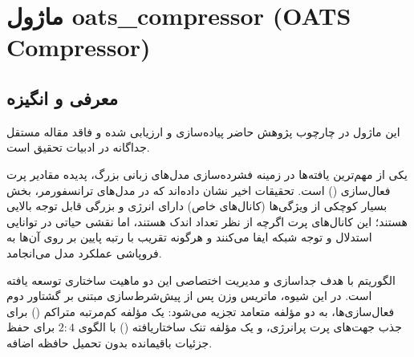 \section{ماژول oats\_compressor (OATS Compressor)}
\label{sec:module_oats_compressor}

\subsection{معرفی و انگیزه}
این ماژول در چارچوب پژوهش حاضر پیاده‌سازی و ارزیابی شده و فاقد مقاله مستقل جداگانه در ادبیات تحقیق است.

یکی از مهم‌ترین یافته‌ها در زمینه فشرده‌سازی مدل‌های زبانی بزرگ، پدیده مقادیر پرت فعال‌سازی () است. تحقیقات اخیر نشان داده‌اند که در مدل‌های ترانسفورمر، بخش بسیار کوچکی از ویژگی‌ها (کانال‌های خاص) دارای انرژی و بزرگی قابل توجه بالایی هستند؛ این کانال‌های پرت اگرچه از نظر تعداد اندک هستند، اما نقشی حیاتی در توانایی استدلال و توجه شبکه ایفا می‌کنند و هرگونه تقریب با رتبه پایین بر روی آن‌ها به فروپاشی عملکرد مدل می‌انجامد.

الگوریتم  با هدف جداسازی و مدیریت اختصاصی این دو ماهیت ساختاری توسعه یافته است. در این شیوه، ماتریس وزن پس از پیش‌شرط‌سازی مبتنی بر گشتاور دوم فعال‌سازی‌ها، به دو مؤلفه متعامد تجزیه می‌شود: یک مؤلفه کم‌مرتبه متراکم () برای جذب جهت‌های پرت پرانرژی، و یک مؤلفه تنک ساختاریافته () با الگوی $2:4$ برای حفظ جزئیات باقیمانده بدون تحمیل حافظه اضافه.

